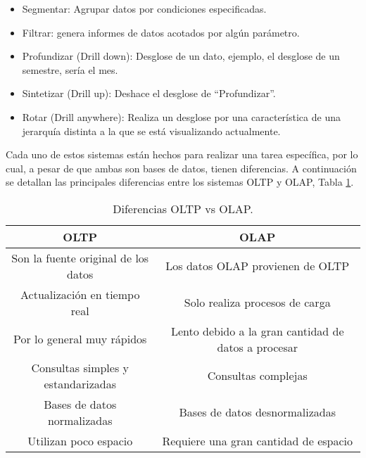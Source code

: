 \begin{enumerate}
\begin{itemize}
    \item Segmentar: Agrupar datos por condiciones especificadas.\\
\item Filtrar: genera informes de datos acotados por algún parámetro.\\
\item Profundizar (Drill down): Desglose de un dato, ejemplo, el desglose de un semestre, sería el mes.\\
\item Sintetizar (Drill up): Deshace el desglose de ``Profundizar''.\\
\item Rotar (Drill anywhere): Realiza un desglose por una característica de una jerarquía distinta a la que se está visualizando actualmente.\\

    
\end{itemize}
    
\end{enumerate}

    Cada uno de estos sistemas están hechos para realizar una tarea específica, por lo cual, a pesar de que ambas son bases de datos, tienen diferencias. A continuación se detallan las principales diferencias entre los sistemas OLTP y OLAP, Tabla \ref{tabla:oltpvsolap}.

\begin{table}[H]
\centering
\begin{tabular}{|c|c|}
\hline
OLTP & OLAP\\ \hline
Son la fuente original de los datos & Los datos OLAP provienen de OLTP \\ \hline
Actualización en tiempo real &	Solo realiza procesos de carga \\ \hline
Por lo general muy rápidos & Lento debido a la gran cantidad de datos a procesar \\ \hline
Consultas simples y estandarizadas & Consultas complejas \\ \hline
Bases de datos normalizadas &	Bases de datos desnormalizadas \\ \hline
Utilizan poco espacio & Requiere una gran cantidad de espacio \\ \hline
\end{tabular}\newline
\caption{Diferencias OLTP vs OLAP. \cite{tablaolapvsoltp}}
\label{tabla:oltpvsolap}
\end{table}


